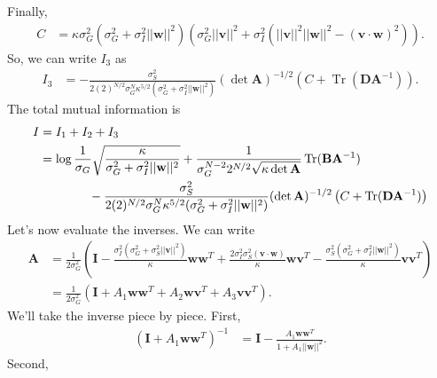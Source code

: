\documentclass[11pt]{article}
\DeclareMathOperator{\Tr}{Tr}
\begin{document}
Finally,
\begin{align}
	C &= \kappa \sigma_G^2 (\sigma_G^2 + \sigma_I^2 ||\mathbf{w}||^2)(\sigma_G^2 ||\mathbf{v}||^2 + \sigma_I^2(||\mathbf{v}||^2 ||\mathbf{w}||^2 - (\mathbf{v}\cdot \mathbf{w})^2)).
\end{align}
So, we can write $I_3$ as 
\begin{align}
	I_3 &= -\frac{\sigma_S^2}{2(2)^{N/2} \sigma_G^N \kappa^{5/2} (\sigma_G^2 + \sigma_I^2 ||\mathbf{w}||^2)}(\det \mathbf{A})^{-1/2} \left(C + \Tr (\mathbf{D}\mathbf{A}^{-1})\right).
\end{align}
The total mutual information is
\begin{align}
	I &= I_1 + I_2 + I_3 \\
	&= \log \frac{1}{\sigma_G} \sqrt{\frac{\kappa}{\sigma_G^2 + \sigma_I^2 ||\mathbf{w}||^2}} +\frac{1}{\sigma_G^{N-2} 2^{N/2} \sqrt{\kappa \det \mathbf{A}}}\Tr(\mathbf{B} \mathbf{A}^{-1}) \notag \\
	&\qquad \qquad -\frac{\sigma_S^2}{2(2)^{N/2} \sigma_G^N \kappa^{5/2} (\sigma_G^2 + \sigma_I^2 ||\mathbf{w}||^2)}(\det \mathbf{A})^{-1/2} \left(C + \Tr (\mathbf{D}\mathbf{A}^{-1})\right)
\end{align}
Let's now evaluate the inverses. We can write 
\begin{align}
	\mathbf{A} &=  \frac{1}{2\sigma_G^2}\left(\mathbf{I} - \frac{\sigma_I^2(\sigma_G^2 +\sigma_S^2 ||\mathbf{v}||^2)}{\kappa} \mathbf{ww}^T+ \frac{2\sigma_I^2 \sigma_S^2 (\mathbf{v}\cdot \mathbf{w})}{ \kappa} \mathbf{wv}^T - \frac{\sigma_S^2 (\sigma_G^2 + \sigma_I^2 ||\mathbf{w}||^2)}{ \kappa} \mathbf{vv}^T\right)\\
	&= \frac{1}{2\sigma_G^2}(\mathbf{I} +A_1 \mathbf{ww}^T + A_2 \mathbf{wv}^T + A_3 \mathbf{vv}^T).
\end{align}
We'll take the inverse piece by piece. First, 
\begin{align}
	(\mathbf{I} + A_1 \mathbf{ww}^T)^{-1} &= \mathbf{I} - \frac{A_1 \mathbf{ww}^T}{1 + A_1 ||\mathbf{w}||^2}.
\end{align}
Second,
\end{document}
